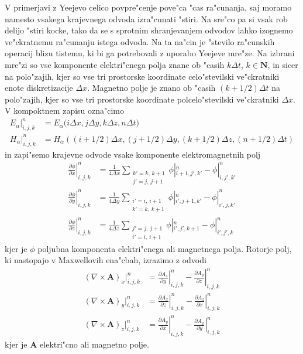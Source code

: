 \documentclass[12pt,twoside,openright,final]{report}
\renewcommand{\vec}{\mathbf}
\begin{document}
V primerjavi z Yeejevo celico povpre"cenje pove"ca "cas ra"cunanja, saj moramo namesto vsakega krajevnega odvoda izra"cunati "stiri. 
Na sre"co pa si vsak rob delijo "stiri kocke, tako da se s sprotnim shranjevanjem odvodov lahko izognemo ve"ckratnemu ra"cunanju istega odvoda. 
Na ta na"cin je "stevilo ra"cunskih operacij blizu tistemu, ki bi ga potrebovali z uporabo Yeejeve mre"ze. Na izbrani mre"zi so vse komponente elektri"cnega polja znane ob "casih $k\Delta t$, $k\in\mathbf{N}$, in sicer na polo"zajih, kjer so vse tri prostorske koordinate celo"stevilski ve"ckratniki enote diskretizacije $\Delta x$. 
Magnetno polje je znano ob "casih $(k+1/2)\Delta t$ na polo"zajih, kjer so vse tri prostorske koordinate polcelo"stevilski ve"ckratniki $\Delta x$. 
V kompoktnem zapisu ozna"cimo
\begin{align}
 E_\alpha|_{i,j,k}^n &= E_\alpha\Big(i\Delta x, j\Delta y, k\Delta z, n \Delta t\Big) \\
 H_\alpha|_{i,j,k}^n &= H_\alpha\left(\left(i+1/2\right)\Delta x, \left(j+1/2\right)\Delta y, \left(k+1/2\right)\Delta z, \left(n+1/2\right) \Delta t\right)
\end{align}
in zapi"semo krajevne odvode vsake komponente elektromagnetnih polj
\newcommand{\sumij}[2]{\substack{ #1' = #1,\, #1+1 \\ #2' = #2,\, #2+1}}
\begin{align}
 \label{eq:diskretni-odvodi}
 \left.\frac{\partial \phi}{\partial x}\right|_{i,j,k}^n &= \frac{1}{4\Delta x}\sum_{\sumij{k}{j}} \phi|_{i+1,j',k'}^{n} - \phi|_{i,j',k'}^{n} \\
 \left.\frac{\partial \phi}{\partial y}\right|_{i,j,k}^n &= \frac{1}{4\Delta y}\sum_{\sumij{i}{k}} \phi|_{i',j+1,k'}^{n} - \phi|_{i',j,k'}^{n} \\
 \left.\frac{\partial \phi}{\partial z}\right|_{i,j,k}^n &= \frac{1}{4\Delta z}\sum_{\sumij{j}{i}} \phi|_{i',j',k+1}^{n} - \phi|_{i',j',k}^{n}	
\end{align}
kjer je $\phi$ poljubna komponenta elektri"cnega ali magnetnega polja.
Rotorje polj, ki nastopajo v Maxwellovih ena"cbah, izrazimo z odvodi
\begin{align}
 \label{eq:diskretni-rotor}
 (\nabla\times\vec A)_x|_{i,j,k}^n &= \left.\frac{\partial A_z}{\partial y}\right|_{i,j,k}^n - \left.\frac{\partial A_y}{\partial z}\right|_{i,j,k}^n\\
 (\nabla\times\vec A)_y|_{i,j,k}^n &= \left.\frac{\partial A_x}{\partial z}\right|_{i,j,k}^n - \left.\frac{\partial A_z}{\partial x}\right|_{i,j,k}^n\\
 (\nabla\times\vec A)_z|_{i,j,k}^n &= \left.\frac{\partial A_y}{\partial x}\right|_{i,j,k}^n - \left.\frac{\partial A_x}{\partial y}\right|_{i,j,k}^n
\end{align}
kjer je $\vec A$ elektri"cno ali magnetno polje. 
\end{document}

